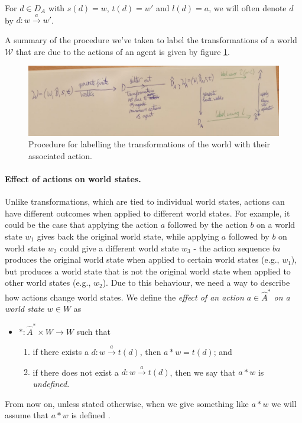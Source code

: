 For $d \in D_{A}$ with $s(d) = w$, $t(d) = w'$ and $l(d) = a$, we will often denote $d$ by $d: w \xrightarrow{a} w'$.

A summary of the procedure we've taken to label the transformations of a world $\mathscr{W}$ that are due to the actions of an agent is given by figure \ref{fig:action_labelling_procedure}.

\begin{figure}
	\centering
	\includegraphics[width=\linewidth]{2MathematicalFramework/InitialFramework/Images/action_labelling_procedure.jpeg}
	\caption{Procedure for labelling the transformations of the world with their associated action.}
	\label{fig:action_labelling_procedure}
\end{figure}


\paragraph{Effect of actions on world states.}
Unlike transformations, which are tied to individual world states, actions can have different outcomes when applied to different world states.
For example, it could be the case that applying the action $a$ followed by the action $b$ on a world state $w_{1}$ gives back the original world state, while applying $a$ followed by $b$ on world state $w_{2}$ could give a different world state $w_{3}$ - the action sequence $ba$ produces the original world state when applied to certain world states (e.g., $w_{1}$), but produces a world state that is not the original world state when applied to other world states (e.g., $w_{2}$).
Due to this behaviour, we need a way to describe how actions change world states.
We define the \emph{effect of an action $a \in \hat{A}^{\ast}$ on a world state $w \in W$} as

\begin{itemize}
	\item[] $\ast: \hat{A}^{\ast} \times W \to W$ such that
	      \begin{enumerate}[(1)]
		      \item if there exists a $d: w \xrightarrow{a} t(d)$, then $a \ast w = t(d)$; and
		      \item if there does not exist a $d: w \xrightarrow{a} t(d)$, then we say that $a \ast w$ is \emph{undefined}.
	      \end{enumerate}
\end{itemize}
From now on, unless stated otherwise, when we give something like $a \ast w$ we will assume that $a \ast w$ is defined .


